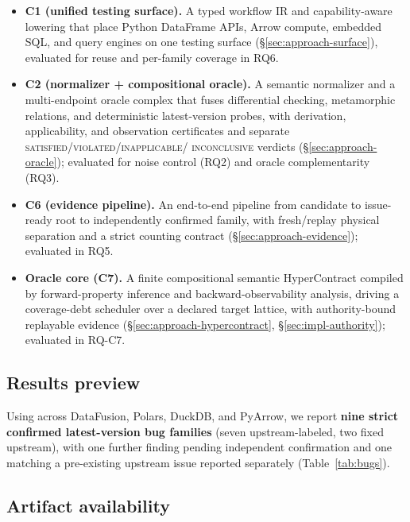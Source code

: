 \begin{itemize}[leftmargin=*,itemsep=2pt]
  \item \textbf{C1 (unified testing surface).} A typed workflow IR and capability-aware
  lowering that place Python DataFrame APIs, Arrow compute, embedded SQL, and query engines on
  one testing surface (\S\ref{sec:approach-surface}), evaluated for reuse and per-family
  coverage in RQ6.
  \item \textbf{C2 (normalizer + compositional oracle).} A semantic normalizer and a
  multi-endpoint oracle complex that fuses differential checking, metamorphic relations, and
  deterministic latest-version probes, with derivation, applicability, and observation
  certificates and separate \textsc{satisfied}/\textsc{violated}/\textsc{inapplicable}/
  \textsc{inconclusive} verdicts (\S\ref{sec:approach-oracle}); evaluated for noise control
  (RQ2) and oracle complementarity (RQ3).
  \item \textbf{C6 (evidence pipeline).} An end-to-end pipeline from candidate to
  issue-ready root to independently confirmed family, with fresh/replay physical separation
  and a strict counting contract (\S\ref{sec:approach-evidence}); evaluated in RQ5.
  \item \textbf{Oracle core (C7).} A finite compositional semantic HyperContract compiled by
  forward-property inference and backward-observability analysis, driving a coverage-debt
  scheduler over a declared target lattice, with authority-bound replayable evidence
  (\S\ref{sec:approach-hypercontract}, \S\ref{sec:impl-authority}); evaluated in RQ-C7.
\end{itemize}

\subsection{Results preview}

Using \sys{} across DataFusion, Polars, DuckDB, and PyArrow, we report \textbf{nine strict
confirmed latest-version bug families} (seven upstream-labeled, two fixed upstream), with one
further finding pending independent confirmation and one matching a pre-existing upstream
issue reported separately (Table~\ref{tab:bugs}). 

\subsection{Artifact availability}

